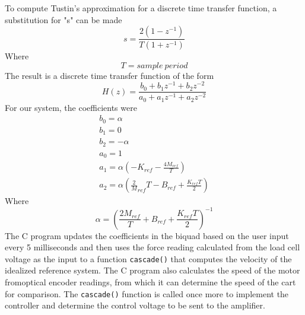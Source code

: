 To compute Tustin's approximation for a discrete time transfer function, a substitution for "s" can be made
\begin{equation}
s=\frac{2(1-z^{-1})}{T(1+z^{-1})}
\end{equation}
Where
\begin{equation}
T= sample\ period
\end{equation}
The result is a discrete time transfer function of the form
\begin{equation}
H(z)=\frac{b_{0}+b_{1}z^{-1}+b_{2}z^{-2}}{a_{0}+a_{1}z^{-1}+a_{2}z^{-2}}
\end{equation}
For our system, the coefficients were
\begin{eqnarray}
b_{0}=\alpha \\
b_{1}=0 \\
b_{2}=-\alpha \\
a_{0}=1 \\
a_{1}=\alpha(-K_{ref}-\frac{4M_{ref}}{T}) \\
a_{2}=\alpha(\frac2M_{ref}{T}-B_{ref}+\frac{K_{ref}T}{2})
\end{eqnarray}
Where
\begin{equation}
\alpha=(\frac{2M_{ref}}{T}+B_{ref}+\frac{K_{ref}T}{2})^{-1}
\end{equation}
The C program updates the coefficients in the biquad based on the user input every 5 milliseconds and then uses the force reading calculated from the load cell voltage as the input to a function \verb|cascade()| that computes the velocity of the idealized reference system. The C program also calculates the speed of the motor fromoptical encoder readings, from which it can determine the speed of the cart for comparison. The \verb|cascade()| function is called once more to implement the controller and determine the control voltage to be sent to the amplifier. 